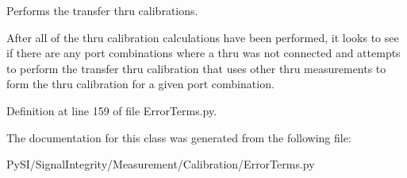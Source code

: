 Performs the transfer thru calibrations. 

After all of the thru calibration calculations have been performed, it looks to see if there are any port combinations where a thru was not connected and attempts to perform the \textquotesingle{}transfer thru\textquotesingle{} calibration that uses other thru measurements to form the thru calibration for a given port combination. 

Definition at line 159 of file Error\+Terms.\+py.



The documentation for this class was generated from the following file\+:\begin{DoxyCompactItemize}
\item 
Py\+S\+I/\+Signal\+Integrity/\+Measurement/\+Calibration/Error\+Terms.\+py\end{DoxyCompactItemize}
